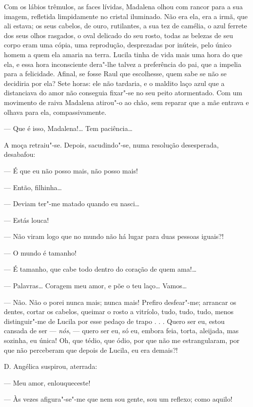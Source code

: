 Com os lábios trêmulos, as faces lívidas, Madalena olhou com rancor para
a sua imagem, refletida limpidamente no cristal iluminado. Não era ela,
era a irmã, que ali estava; os seus cabelos, de ouro, rutilantes, a sua
tez de camélia, o azul ferrete dos seus olhos rasgados, o oval delicado
do seu rosto, todas as belezas de seu corpo eram uma cópia, uma
reprodução, desprezadas por inúteis, pelo único homem a quem ela amaria
na terra. Lucila tinha de vida mais uma hora do que ela, e essa hora
inconsciente dera"-lhe talvez a preferência do pai, que a impelia para a
felicidade. Afinal, se fosse Raul que escolhesse, quem sabe se não se
decidiria por ela? Sete horas: ele não tardaria, e o maldito laço azul
que a distanciava do amor não conseguia fixar"-se no seu peito
atormentado. Com um movimento de raiva Madalena atirou"-o ao chão, sem
reparar que a mãe entrava e olhava para ela, compassivamente.

--- Que é isso, Madalena!\ldots{} Tem paciência\ldots{}

A moça retraiu"-se. Depois, sacudindo"-se, numa resolução desesperada,
desabafou:

--- É que eu não posso mais, não posso mais!

--- Então, filhinha\ldots{}

--- Deviam ter"-me matado quando eu nasci\ldots{}

--- Estás louca!

--- Não viram logo que no mundo não há lugar para duas pessoas iguais?!

--- O mundo é tamanho!

--- É tamanho, que cabe todo dentro do coração de quem ama!\ldots{}

--- Palavras\ldots{} Coragem meu amor, e põe o teu laço\ldots{} Vamos\ldots{}

--- Não. Não o porei nunca mais; nunca mais! Prefiro desfear"-me;
arrancar os dentes, cortar os cabelos, queimar o rosto a vitríolo, tudo,
tudo, tudo, menos distinguir"-me de Lucila por esse pedaço de trapo . . .
Quero ser eu, estou cansada de ser --- \emph{nós}, --- quero ser eu, só
eu, embora feia, torta, aleijada, mas sozinha, eu única! Oh, que tédio,
que ódio, por que não me estrangularam, por que não perceberam que
depois de Lucila, eu era demais?!

D. Angélica suspirou, aterrada:

--- Meu amor, enlouqueceste!

--- Às vezes afigura"-se"-me que nem sou gente, sou um reflexo; como
aquilo!

